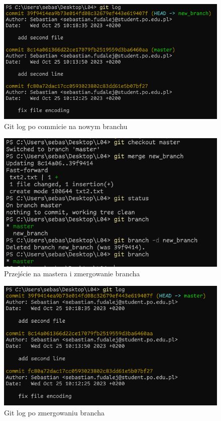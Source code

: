 \documentclass{article} %
\begin{document}
\begin{figure}[h]
	\centering
	\includegraphics[width=1\textwidth]{image/git/17.png}
	\caption{Git log po commicie na nowym branchu}
\end{figure}

\begin{figure}[h]
	\centering
	\includegraphics[width=1\textwidth]{image/git/18.png}
	\caption{Przejście na mastera i zmergowanie brancha}
\end{figure}

\begin{figure}[h]
	\centering
	\includegraphics[width=1\textwidth]{image/git/19.png}
	\caption{Git log po zmergowaniu brancha}
\end{figure}
\end{document}
